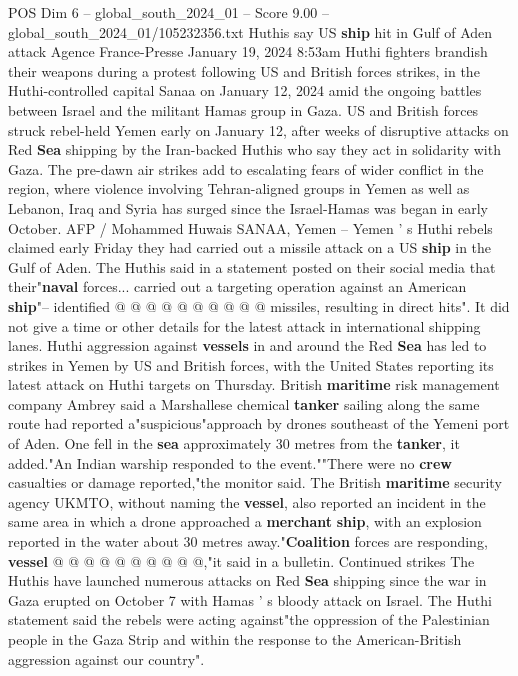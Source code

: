 \begin{textsample}{POS Dim 6 – global\_south\_2024\_01 – Score 9.00 – global\_south\_2024\_01/105232356.txt}  \label{ex:f6_pos_083}
Huthis say US \textbf{ship} hit in Gulf of Aden attack Agence France-Presse January 19, 2024 8:53am Huthi fighters brandish their weapons during a protest following US and British forces strikes, in the Huthi-controlled capital Sanaa on January 12, 2024 amid the ongoing battles between Israel and the militant Hamas group in Gaza.
US and British forces struck rebel-held Yemen early on January 12, after weeks of disruptive attacks on Red \textbf{Sea} shipping by the Iran-backed Huthis who say they act in solidarity with Gaza.
The pre-dawn air strikes add to escalating fears of wider conflict in the region, where violence involving Tehran-aligned groups in Yemen as well as Lebanon, Iraq and Syria has surged since the Israel-Hamas was began in early October.
AFP / Mohammed Huwais SANAA, Yemen -- Yemen ' s Huthi rebels claimed early Friday they had carried out a missile attack on a US \textbf{ship} in the Gulf of Aden.
The Huthis said in a statement posted on their social media that their"\textbf{naval} forces... carried out a targeting operation against an American \textbf{ship}"-- identified @ @ @ @ @ @ @ @ @ @ missiles, resulting in direct hits".
It did not give a time or other details for the latest attack in international shipping lanes.
Huthi aggression against \textbf{vessels} in and around the Red \textbf{Sea} has led to strikes in Yemen by US and British forces, with the United States reporting its latest attack on Huthi targets on Thursday.
British \textbf{maritime} risk management company Ambrey said a Marshallese chemical \textbf{tanker} sailing along the same route had reported a"suspicious"approach by drones southeast of the Yemeni port of Aden.
One fell in the \textbf{sea} approximately 30 metres from the \textbf{tanker}, it added."An Indian warship responded to the event.""There were no \textbf{crew} casualties or damage reported,"the monitor said.
The British \textbf{maritime} security agency UKMTO, without naming the \textbf{vessel}, also reported an incident in the same area in which a drone approached a \textbf{merchant} \textbf{ship}, with an explosion reported in the water about 30 metres away."\textbf{Coalition} forces are responding, \textbf{vessel} @ @ @ @ @ @ @ @ @ @,"it said in a bulletin.
Continued strikes The Huthis have launched numerous attacks on Red \textbf{Sea} shipping since the war in Gaza erupted on October 7 with Hamas ' s bloody attack on Israel.
The Huthi statement said the rebels were acting against"the oppression of the Palestinian people in the Gaza Strip and within the response to the American-British aggression against our country".

\end{textsample}
